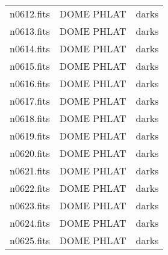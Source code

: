\begin{table}
\begin{tabular}{ccc}
n0612.fits & DOME PHLAT & darks \\
n0613.fits & DOME PHLAT & darks \\
n0614.fits & DOME PHLAT & darks \\
n0615.fits & DOME PHLAT & darks \\
n0616.fits & DOME PHLAT & darks \\
n0617.fits & DOME PHLAT & darks \\
n0618.fits & DOME PHLAT & darks \\
n0619.fits & DOME PHLAT & darks \\
n0620.fits & DOME PHLAT & darks \\
n0621.fits & DOME PHLAT & darks \\
n0622.fits & DOME PHLAT & darks \\
n0623.fits & DOME PHLAT & darks \\
n0624.fits & DOME PHLAT & darks \\
n0625.fits & DOME PHLAT & darks \\
\end{tabular}
\end{table}

